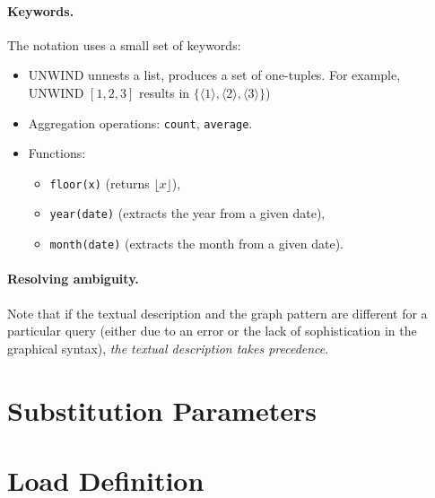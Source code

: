 \newcommand{\tuple}[1]{\langle #1 \rangle}

\paragraph{Keywords.} The notation uses a small set of keywords:

\begin{itemize}
	\item \textsf{UNWIND} unnests a list, \ie produces a set of one-tuples. For example, UNWIND $ [1, 2, 3] $ results in $ \{ \tuple{1}, \tuple{2}, \tuple{3} \} $)
	\item Aggregation operations: \lstinline{count}, \lstinline{average}. %
	\item Functions:
	\begin{itemize}
		\item \lstinline{floor(x)} (returns $\lfloor x \rfloor$),
		\item \lstinline{year(date)} (extracts the year from a given date),
		\item \lstinline{month(date)} (extracts the month from a given date).
	\end{itemize}
\end{itemize}

\paragraph{Resolving ambiguity.} Note that if the textual description and the graph pattern are different for a particular query (either due to an error or the lack of sophistication in the graphical syntax), \emph{the textual description takes precedence}.


\section{Substitution Parameters}




\section{Load Definition}


